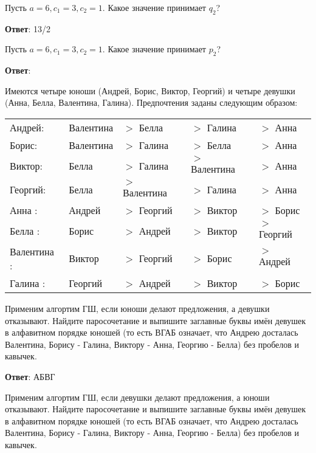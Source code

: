 \task
Пусть $a = 6, c_1 = 3, c_2 = 1$. Какое значение принимает $q_2$?

\textbf{Ответ}: 
13/2

\solution %

\task Пусть $a=6, c_1=3, c_2=1$. Какое значение принимает $p_2$?

\textbf{Ответ}: 


\solution %

\task
Имеются четыре юноши (Андрей, Борис, Виктор, Георгий) и четыре девушки (Анна, Белла, Валентина, Галина). Предпочтения заданы следующим образом:

\begin{tabular}{lllll}
	\hline
	Андрей: &Валентина &$>$ Белла &$>$ Галина &$>$ Анна \\
	
	Борис:&Валентина &$>$ Галина &$>$ Белла &$>$ Анна \\
	
	Виктор:&Белла &$>$ Галина &$>$ Валентина &$>$ Анна \\
	
	Георгий:&Белла&$>$ Валентина &$>$ Галина &$>$ Анна \\
	
	Анна :&Андрей &$>$ Георгий &$>$ Виктор &$>$ Борис \\
	
	Белла :&Борис &$>$ Андрей &$>$ Виктор &$>$ Георгий \\
	
	Валентина :&Виктор &$>$ Георгий &$>$ Борис &$>$ Андрей \\
	
	Галина :&Георгий &$>$ Андрей &$>$ Виктор &$>$ Борис \\
	\hline
\end{tabular}

Применим алгортим ГШ, если юноши делают предложения, а девушки отказывают. Найдите паросочетание и выпишите заглавные буквы имён девушек в алфавитном порядке юношей (то есть ВГАБ означает, что Андрею досталась Валентина, Борису - Галина, Виктору - Анна, Георгию - Белла) без пробелов и кавычек.

\textbf{Ответ}: 
АБВГ	%

\solution %

\task 
Применим алгортим ГШ, если девушки делают предложения, а юноши отказывают. Найдите паросочетание и выпишите заглавные буквы имён девушек в алфавитном порядке юношей (то есть ВГАБ означает, что Андрею досталась Валентина, Борису - Галина, Виктору - Анна, Георгию - Белла) без пробелов и кавычек.

